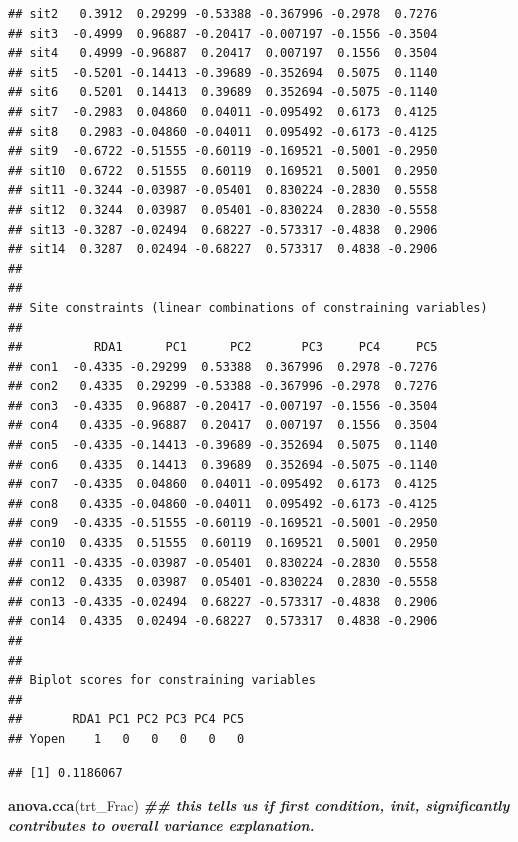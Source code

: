 \documentclass[
]{article}
\newenvironment{Shaded}{\begin{snugshade}}{\end{snugshade}}
\newcommand{\CommentTok}[1]{\textcolor[rgb]{0.56,0.35,0.01}{\textit{#1}}}
\newcommand{\DocumentationTok}[1]{\textcolor[rgb]{0.56,0.35,0.01}{\textbf{\textit{#1}}}}
\newcommand{\FunctionTok}[1]{\textcolor[rgb]{0.13,0.29,0.53}{\textbf{#1}}}
\newcommand{\NormalTok}[1]{#1}
\newcommand{\SpecialCharTok}[1]{\textcolor[rgb]{0.81,0.36,0.00}{\textbf{#1}}}
\begin{document}
\begin{verbatim}
## sit2   0.3912  0.29299 -0.53388 -0.367996 -0.2978  0.7276
## sit3  -0.4999  0.96887 -0.20417 -0.007197 -0.1556 -0.3504
## sit4   0.4999 -0.96887  0.20417  0.007197  0.1556  0.3504
## sit5  -0.5201 -0.14413 -0.39689 -0.352694  0.5075  0.1140
## sit6   0.5201  0.14413  0.39689  0.352694 -0.5075 -0.1140
## sit7  -0.2983  0.04860  0.04011 -0.095492  0.6173  0.4125
## sit8   0.2983 -0.04860 -0.04011  0.095492 -0.6173 -0.4125
## sit9  -0.6722 -0.51555 -0.60119 -0.169521 -0.5001 -0.2950
## sit10  0.6722  0.51555  0.60119  0.169521  0.5001  0.2950
## sit11 -0.3244 -0.03987 -0.05401  0.830224 -0.2830  0.5558
## sit12  0.3244  0.03987  0.05401 -0.830224  0.2830 -0.5558
## sit13 -0.3287 -0.02494  0.68227 -0.573317 -0.4838  0.2906
## sit14  0.3287  0.02494 -0.68227  0.573317  0.4838 -0.2906
## 
## 
## Site constraints (linear combinations of constraining variables)
## 
##          RDA1      PC1      PC2       PC3     PC4     PC5
## con1  -0.4335 -0.29299  0.53388  0.367996  0.2978 -0.7276
## con2   0.4335  0.29299 -0.53388 -0.367996 -0.2978  0.7276
## con3  -0.4335  0.96887 -0.20417 -0.007197 -0.1556 -0.3504
## con4   0.4335 -0.96887  0.20417  0.007197  0.1556  0.3504
## con5  -0.4335 -0.14413 -0.39689 -0.352694  0.5075  0.1140
## con6   0.4335  0.14413  0.39689  0.352694 -0.5075 -0.1140
## con7  -0.4335  0.04860  0.04011 -0.095492  0.6173  0.4125
## con8   0.4335 -0.04860 -0.04011  0.095492 -0.6173 -0.4125
## con9  -0.4335 -0.51555 -0.60119 -0.169521 -0.5001 -0.2950
## con10  0.4335  0.51555  0.60119  0.169521  0.5001  0.2950
## con11 -0.4335 -0.03987 -0.05401  0.830224 -0.2830  0.5558
## con12  0.4335  0.03987  0.05401 -0.830224  0.2830 -0.5558
## con13 -0.4335 -0.02494  0.68227 -0.573317 -0.4838  0.2906
## con14  0.4335  0.02494 -0.68227  0.573317  0.4838 -0.2906
## 
## 
## Biplot scores for constraining variables
## 
##       RDA1 PC1 PC2 PC3 PC4 PC5
## Yopen    1   0   0   0   0   0
\end{verbatim}

\begin{Shaded}
\end{Shaded}

\begin{verbatim}
## [1] 0.1186067
\end{verbatim}

\begin{Shaded}
\begin{Highlighting}[]
\FunctionTok{anova.cca}\NormalTok{(trt\_Frac) }\DocumentationTok{\#\# this tells us if first condition, init, significantly contributes to overall variance explanation. }
\end{Highlighting}
\end{Shaded}
\end{document}

